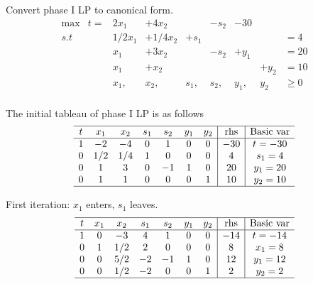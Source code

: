 \documentclass[12pt]{article}
\begin{document}
Convert phase I LP to canonical form.
\begin{equation*}
  \begin{array}{ccccccccc}
    \text{max}& t= &    2x_1      & +4x_2  & & -s_2  & -30 &  &        \\ 
    s.t       &    &    1/2x_1      &   + 1/4x_2 &    +s_1 &           &&      &  =4              \\
              &    &    x_1      &    +3x_2 &     &   -s_2  &  +y_1&&           = 20          \\
              &    &    x_1      &    + x_2 &     &             &  &+y_2&           = 10          \\
              &    &    x_1,      &    x_2, &    s_1, &    s_2,  &   y_1,  & y_2 &         \ge 0\\ 
  \end{array}
\end{equation*}

The initial tableau of phase I LP is as follows
\begin{equation*}
  \begin{array}{ccccccc|c|c}
    \hline
    t &  x_1      &  x_2   &  s_1 & s_2 & y_1 & y_2        &   \text{rhs} & \text{Basic var}  \\ \hline
    1 &    -2      &  -4  &    0       & 1  & 0 & 0 & -30          &  t=-30              \\
    0 &    1/2      &  1/4  &    1       & 0  & 0 & 0 & 4          &  s_1=4              \\
    0 &    1      &  3   &    0       & -1 & 1 & 0 & 20            &  y_1 = 20          \\
    0 &    1      &  1   &   0       & 0    & 0 & 1 & 10        &  y_2 = 10          \\ \hline
  \end{array}
\end{equation*}

First iteration: $x_1$ enters, $s_1$ leaves.
\begin{equation*}
  \begin{array}{ccccccc|c|c}
    \hline
    t &  x_1      &  x_2   &  s_1 & s_2 & y_1 & y_2        &   \text{rhs} & \text{Basic var}  \\ \hline
    1 &    0      &  -3  &    4       & 1  & 0 & 0 & -14          &  t=-14              \\
    0 &    1      &  1/2  &    2       & 0  & 0 & 0 & 8          &  x_1=8              \\
    0 &    0      &  5/2   &    -2       & -1 & 1 & 0 & 12            &  y_1 = 12          \\
    0 &    0      &  1/2   &   -2       & 0    & 0 & 1 & 2        &  y_2 = 2          \\ \hline
  \end{array}
\end{equation*}
\end{document}
